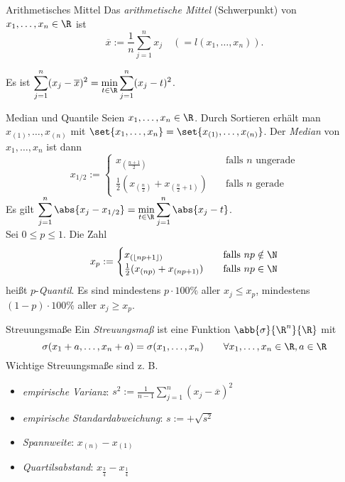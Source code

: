 \begin{karte}{Arithmetisches Mittel}
	Das \textit{arithmetische Mittel} (Schwerpunkt) von $x_1,\dotsc,x_n \in \R$ ist 
	$$ \overline{x} := \frac{1}{n}\sum_{j=1}^{n} x_j \quad (= l(x_1,\dotsc,x_n)).$$
	
	Es ist $\displaystyle \sum_{j=1}^{n} (x_j-\overline{x})^2 = 
	\min_{t \in \R} \sum_{j=1}^{n} (x_j-t)^2$.
\end{karte}
\begin{karte}{Median und Quantile}
	Seien $x_1,\dotsc,x_n \in \R$. Durch Sortieren erhält man $ x_{(1)},\dotsc,x_{(n)}$ mit $\set{x_1,\dotsc,x_n} = \set{x_{(1)},\dotsc,x_{(n)}}$. Der \textit{Median} von $x_1,\dotsc,x_n$ ist dann
	$$x_{1/2}:= \begin{cases}
	x_{(\frac{n+1}{2})} & \quad \text{falls } n \text{ ungerade} \\
	\frac{1}{2}(x_{(\frac{n}{2})}+x_{(\frac{n}{2}+1)}) & \quad \text{falls } n \text{ gerade}
	\end{cases}$$
	Es gilt $\displaystyle \sum_{j=1}^{n} \abs{x_j - x_{1/2}} = \min_{t \in \R} \sum_{j=1}^{n} \abs{x_j-t}$. \\
	Sei $0 \le p \le 1$. Die Zahl
	$$x_p:= \begin{cases}
	x_{(\lfloor np+1 \rfloor)} & \quad \text{falls } np \notin \N \\
	\frac{1}{2}(x_{(np)}+x_{(np+1)}) & \quad \text{falls } np \in \N
	\end{cases}$$ heißt $p$-\textit{Quantil}. Es sind mindestens $p\cdot 100 \% $ aller $x_j \leq x_p$, mindestens $(1-p)\cdot 100 \%$ aller $x_j \geq x_p$.
\end{karte}

\begin{karte}{Streuungsmaße}
	Ein \textit{Streuungsmaß} ist eine Funktion $\abb{\sigma}{\R^n}{\R}$ mit $$\sigma(x_1+a,\dotsc,x_n+a) = \sigma(x_1,\dotsc,x_n) \qquad \forall x_1,\dotsc,x_n \in \R, a \in \R$$
	Wichtige Streuungsmaße sind z. B.
	\begin{itemize}
		\item \textit{empirische Varianz}: $\displaystyle s^2:=\frac{1}{n-1} \sum_{j=1}^{n} (x_j-\overline{x})^2$
		\item \textit{empirische Standardabweichung}: $s :=+\sqrt{s^2}$
		\item \textit{Spannweite}: $x_{(n)}-x_{(1)}$
		\item \textit{Quartilsabstand}: $x_{\frac{3}{4}}-x_{\frac{1}{4}}$
	\end{itemize}
\end{karte}


